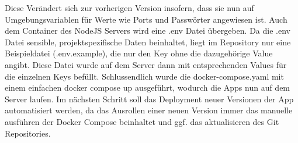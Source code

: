 

Diese Verändert sich zur vorherigen Version insofern, dass sie nun auf Umgebungsvariablen für Werte wie Ports und Passwörter angewiesen ist.
Auch dem Container des NodeJS Servers wird eine .env Datei übergeben.
Da die .env Datei sensible, projektspezifische Daten beinhaltet, liegt im Repository nur eine Beispieldatei (.env.example), die nur den Key ohne die dazugehörige Value angibt.
Diese Datei wurde auf dem Server dann mit entsprechenden Values für die einzelnen Keys befüllt.
Schlussendlich wurde die docker-compose.yaml mit einem einfachen docker compose up ausgeführt, wodurch die Apps nun auf dem Server laufen.
Im nächsten Schritt soll das Deployment neuer Versionen der App automatisiert werden, da das Ausrollen einer neuen Version immer das manuelle ausführen der Docker Compose beinhaltet und ggf. das aktualisieren des Git Repositories.
